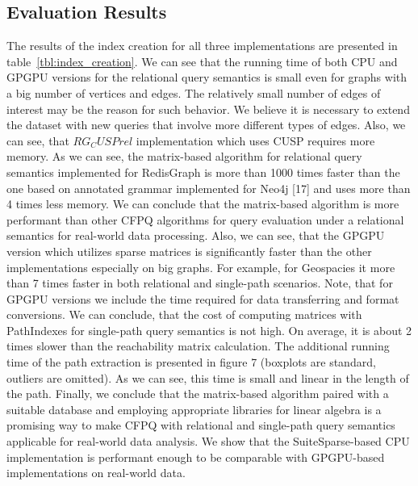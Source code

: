 \subsection{Evaluation Results}
The results of the index creation for all three implementations are presented in table~\ref{tbl:index_creation}. We can see that the running time of both CPU
and GPGPU versions for the relational query semantics is
small even for graphs with a big number of vertices and
edges. The relatively small number of edges of interest may
be the reason for such behavior. We believe it is necessary
to extend the dataset with new queries that involve more
different types of edges. Also, we can see, that $RG_CUSPrel$
implementation which uses CUSP requires more memory.
As we can see, the matrix-based algorithm for relational
query semantics implemented for RedisGraph is more than
1000 times faster than the one based on annotated grammar
implemented for Neo4j [17] and uses more than 4 times less
memory. We can conclude that the matrix-based algorithm
is more performant than other CFPQ algorithms for query
evaluation under a relational semantics for real-world data
processing.
Also, we can see, that the GPGPU version which utilizes
sparse matrices is significantly faster than the other implementations especially on big graphs. For example, for
Geospacies it more than 7 times faster in both relational and
single-path scenarios. Note, that for GPGPU versions we
include the time required for data transferring and format
conversions.
We can conclude, that the cost of computing matrices
with PathIndexes for single-path query semantics is not high.
On average, it is about 2 times slower than the reachability
matrix calculation. The additional running time of the path
extraction is presented in figure 7 (boxplots are standard,
outliers are omitted). As we can see, this time is small and
linear in the length of the path.
Finally, we conclude that the matrix-based algorithm paired
with a suitable database and employing appropriate libraries
for linear algebra is a promising way to make CFPQ with
relational and single-path query semantics applicable for
real-world data analysis. We show that the SuiteSparse-based
CPU implementation is performant enough to be comparable
with GPGPU-based implementations on real-world data.

